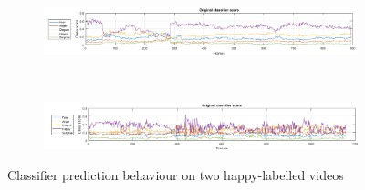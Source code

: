 


\begin{figure}\centering
	\begin{subfigure}[b]{\textwidth}
		\includegraphics[width=1\textwidth]{Chapter5/Figs/DVD31_1_Pridect.png}
		
		\label{fig:database}
	\end{subfigure}\\[1em]
	\begin{subfigure}[b]{\textwidth}
		\includegraphics[width=1\textwidth]{Chapter5/Figs/DVD14_1_Pridect.png}
		
	\end{subfigure}
	\caption{Classifier prediction behaviour on two happy-labelled videos}\label{fig:Classifier_prediction}
\end{figure}

